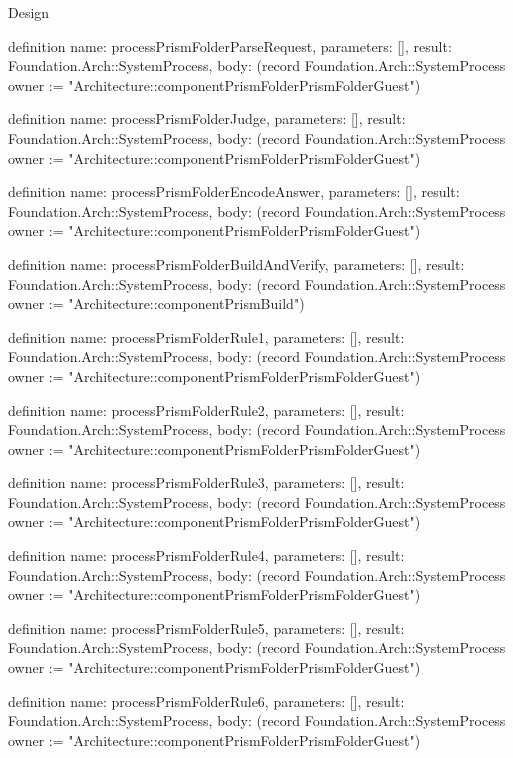 \begin{lexlean}{Design}
\begin{semanticmodule}
definition{
  name: processPrismFolderParseRequest,
  parameters: [],
  result: Foundation.Arch::SystemProcess,
  body: (record Foundation.Arch::SystemProcess {owner := "Architecture::componentPrismFolderPrismFolderGuest"})
}

definition{
  name: processPrismFolderJudge,
  parameters: [],
  result: Foundation.Arch::SystemProcess,
  body: (record Foundation.Arch::SystemProcess {owner := "Architecture::componentPrismFolderPrismFolderGuest"})
}

definition{
  name: processPrismFolderEncodeAnswer,
  parameters: [],
  result: Foundation.Arch::SystemProcess,
  body: (record Foundation.Arch::SystemProcess {owner := "Architecture::componentPrismFolderPrismFolderGuest"})
}

definition{
  name: processPrismFolderBuildAndVerify,
  parameters: [],
  result: Foundation.Arch::SystemProcess,
  body: (record Foundation.Arch::SystemProcess {owner := "Architecture::componentPrismBuild"})
}

definition{
  name: processPrismFolderRule1,
  parameters: [],
  result: Foundation.Arch::SystemProcess,
  body: (record Foundation.Arch::SystemProcess {owner := "Architecture::componentPrismFolderPrismFolderGuest"})
}

definition{
  name: processPrismFolderRule2,
  parameters: [],
  result: Foundation.Arch::SystemProcess,
  body: (record Foundation.Arch::SystemProcess {owner := "Architecture::componentPrismFolderPrismFolderGuest"})
}

definition{
  name: processPrismFolderRule3,
  parameters: [],
  result: Foundation.Arch::SystemProcess,
  body: (record Foundation.Arch::SystemProcess {owner := "Architecture::componentPrismFolderPrismFolderGuest"})
}

definition{
  name: processPrismFolderRule4,
  parameters: [],
  result: Foundation.Arch::SystemProcess,
  body: (record Foundation.Arch::SystemProcess {owner := "Architecture::componentPrismFolderPrismFolderGuest"})
}

definition{
  name: processPrismFolderRule5,
  parameters: [],
  result: Foundation.Arch::SystemProcess,
  body: (record Foundation.Arch::SystemProcess {owner := "Architecture::componentPrismFolderPrismFolderGuest"})
}

definition{
  name: processPrismFolderRule6,
  parameters: [],
  result: Foundation.Arch::SystemProcess,
  body: (record Foundation.Arch::SystemProcess {owner := "Architecture::componentPrismFolderPrismFolderGuest"})
}


\end{semanticmodule}
\end{lexlean}
